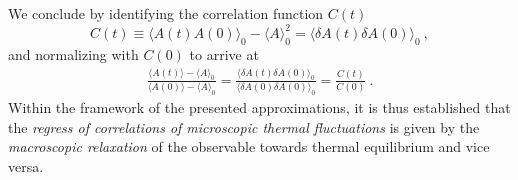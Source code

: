 \documentclass[a4paper]{article}
\begin{document}
We conclude by identifying the correlation function $C(t)$
$$
C(t) \equiv \langle A(t) A(0) \rangle_0 - \langle A \rangle_0^2 = \langle \delta A(t) \delta A(0) \rangle_0~,
$$
and normalizing with $C(0)$ to arrive at
\begin{align}
    \frac{\langle A(t) \rangle - \langle A \rangle_0}{\langle A(0) \rangle - \langle A \rangle_0}
    =
    \frac{\langle \delta A(t) \delta A(0) \rangle_0}{\langle \delta A(0) \delta A(0) \rangle_0}
    = \frac{C (t) }{C(0) }~.
    \label{eq:17}
\end{align}
Within the framework of the presented approximations, it is thus established that the \emph{regress of correlations of microscopic thermal fluctuations} is given by the \emph{macroscopic relaxation} of the observable towards thermal equilibrium and vice versa.
\end{document}
